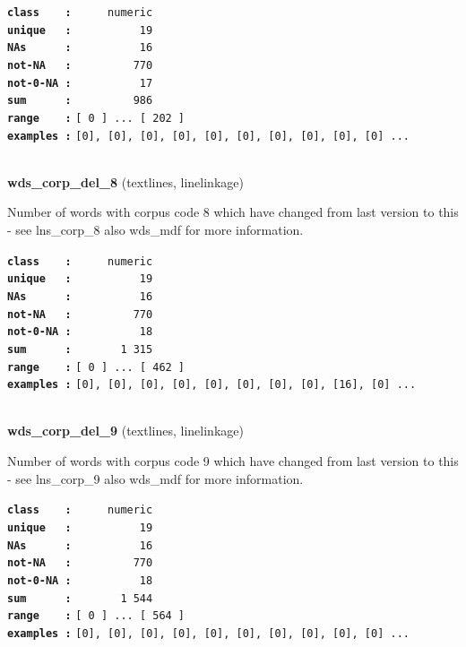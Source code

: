 \documentclass[]{article}
\begin{document}
\textbf{\texttt{class\ \ \ \ :}} \texttt{~~~~~numeric}\\
\textbf{\texttt{unique\ \ \ :}} \texttt{~~~~~~~~~~19}\\
\textbf{\texttt{NAs\ \ \ \ \ \ :}} \texttt{~~~~~~~~~~16}\\
\textbf{\texttt{not-NA\ \ \ :}} \texttt{~~~~~~~~~770}\\
\textbf{\texttt{not-0-NA\ :}} \texttt{~~~~~~~~~~17}\\
\textbf{\texttt{sum\ \ \ \ \ \ :}} \texttt{~~~~~~~~~986}\\
\textbf{\texttt{range\ \ \ \ :}}
\texttt{{[}\ 0\ {]}\ ...\ {[}\ 202\ {]}}\\
\textbf{\texttt{examples\ :}}
\texttt{{[}0{]},\ {[}0{]},\ {[}0{]},\ {[}0{]},\ {[}0{]},\ {[}0{]},\ {[}0{]},\ {[}0{]},\ {[}0{]},\ {[}0{]}\ ...}\\

~

\textbf{wds\_corp\_del\_8} (textlines, linelinkage)

Number of words with corpus code 8 which have changed from last version
to this - see lns\_corp\_8 also wds\_mdf for more information.

\textbf{\texttt{class\ \ \ \ :}} \texttt{~~~~~numeric}\\
\textbf{\texttt{unique\ \ \ :}} \texttt{~~~~~~~~~~19}\\
\textbf{\texttt{NAs\ \ \ \ \ \ :}} \texttt{~~~~~~~~~~16}\\
\textbf{\texttt{not-NA\ \ \ :}} \texttt{~~~~~~~~~770}\\
\textbf{\texttt{not-0-NA\ :}} \texttt{~~~~~~~~~~18}\\
\textbf{\texttt{sum\ \ \ \ \ \ :}} \texttt{~~~~~~~1~315}\\
\textbf{\texttt{range\ \ \ \ :}}
\texttt{{[}\ 0\ {]}\ ...\ {[}\ 462\ {]}}\\
\textbf{\texttt{examples\ :}}
\texttt{{[}0{]},\ {[}0{]},\ {[}0{]},\ {[}0{]},\ {[}0{]},\ {[}0{]},\ {[}0{]},\ {[}0{]},\ {[}16{]},\ {[}0{]}\ ...}\\

~

\textbf{wds\_corp\_del\_9} (textlines, linelinkage)

Number of words with corpus code 9 which have changed from last version
to this - see lns\_corp\_9 also wds\_mdf for more information.

\textbf{\texttt{class\ \ \ \ :}} \texttt{~~~~~numeric}\\
\textbf{\texttt{unique\ \ \ :}} \texttt{~~~~~~~~~~19}\\
\textbf{\texttt{NAs\ \ \ \ \ \ :}} \texttt{~~~~~~~~~~16}\\
\textbf{\texttt{not-NA\ \ \ :}} \texttt{~~~~~~~~~770}\\
\textbf{\texttt{not-0-NA\ :}} \texttt{~~~~~~~~~~18}\\
\textbf{\texttt{sum\ \ \ \ \ \ :}} \texttt{~~~~~~~1~544}\\
\textbf{\texttt{range\ \ \ \ :}}
\texttt{{[}\ 0\ {]}\ ...\ {[}\ 564\ {]}}\\
\textbf{\texttt{examples\ :}}
\texttt{{[}0{]},\ {[}0{]},\ {[}0{]},\ {[}0{]},\ {[}0{]},\ {[}0{]},\ {[}0{]},\ {[}0{]},\ {[}0{]},\ {[}0{]}\ ...}\\
\end{document}
